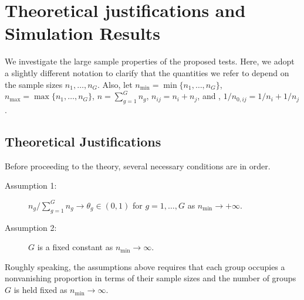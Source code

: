 \documentclass[APA,Times1COL]{WileyNJDv5} %
\begin{document}
\section{Theoretical justifications and Simulation Results} \label{sec:theori}
We investigate the large sample properties of the proposed tests. 
Here, we adopt a slightly different notation to clarify that the quantities we refer to depend on the sample sizes $n_1, \ldots, n_{G}$. Also, let $n_{\min} = \min\{n_1,\ldots, n_{G}\}$, $n_{\max} = \max\{n_1,\ldots, n_{G}\}$, $n = \sum^{G}_{g=1}n_g$, $n_{ij} = n_i + n_j$, and , $1/n_{0,ij} = 1/n_i + 1/n_j$. %

\subsection{Theoretical Justifications} 
Before proceeding to the theory, several necessary conditions are in order.
\begin{description}
  \item[Assumption 1:] $n_g /\sum_{g=1}^{G}n_g \rightarrow \theta_g \in (0, 1)$ for $g=1,\ldots, G$ as $n_{\min} \rightarrow +\infty$. 
  \item[Assumption 2:] $G$ is a fixed constant as $n_{\min} \rightarrow \infty$.
 \end{description}
  Roughly speaking, the assumptions above requires that each group occupies a nonvanishing proportion in terms of their sample sizes and the number of groups $G$ is held fixed as $n_{\min}\to\infty$.
\end{document}
